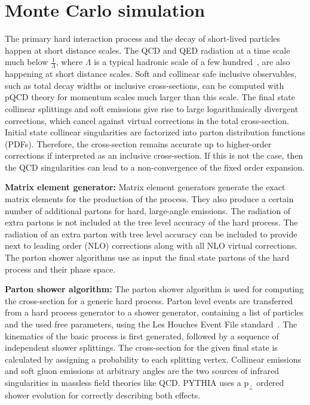 \section{Monte Carlo simulation}

The primary hard interaction process and the decay of short-lived particles happen at short distance scales. The QCD and QED radiation at a time scale much below $\frac{1}{\Lambda}$, where $\Lambda$ is a typical hadronic scale of a few hundred~\MeV, are also happening at short distance scales. Soft and collinear safe inclusive observables, such as total decay widths or inclusive cross-sections, can be computed with pQCD theory for momentum scales much larger than this scale. The final state collinear splittings and soft emissions give rise to large logarithmically divergent corrections, which cancel against virtual corrections in the total cross-section. Initial state collinear singularities are factorized into parton distribution functions (PDFs). Therefore, the cross-section remains accurate up to higher-order corrections if interpreted as an inclusive cross-section. If this is not the case, then the QCD singularities can lead to a non-convergence of the fixed order expansion.

\textbf{Matrix element generator:} Matrix element generators generate the exact matrix elements for the production of the process. They also produce a certain number of additional partons for hard, large-angle emissions. The radiation of extra partons is not included at the tree level accuracy of the hard process. The radiation of an extra parton with tree level accuracy can be included to provide next to leading order (NLO) corrections along with all NLO virtual corrections. The parton shower algorithms use as input the final state partons of the hard process and their phase space.

\textbf{Parton shower algorithm:} The parton shower algorithm is used for computing the cross-section for a generic hard process. Parton level events are transferred from a hard process generator to a shower generator, containing a list of particles and the used free parameters, using the Les Houches Event File standard~\cite{Alwall:2006yp}. The kinematics of the basic process is first generated, followed by a sequence of independent shower splittings. The cross-section for the given final state is calculated by assigning a probability to each splitting vertex. Collinear emissions and soft gluon emissions at arbitrary angles are the two sources of infrared singularities in massless field theories like QCD. PYTHIA uses a $\text{p}_{\perp}$ ordered shower evolution for correctly describing both effects.

